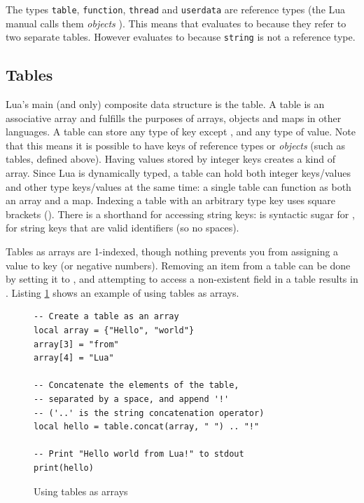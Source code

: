 The types \texttt{table}, \texttt{function}, \texttt{thread} and \texttt{userdata} are reference types (the Lua manual calls them \textit{objects} \cite[\S 2.1]{luareferencemanual}). This means that \lua{{} == {}} evaluates to  because they refer to two separate tables. However  evaluates to  because \texttt{string} is not a reference type.

\subsection{Tables}
Lua's main (and only) composite data structure is the table. A table is an associative array and fulfills the purposes of arrays, objects and maps in other languages. A table can store any type of key except , and any type of value. Note that this means it is possible to have keys of reference types or \textit{objects} (such as tables, defined above). Having values stored by integer keys creates a kind of array. Since Lua is dynamically typed, a table can hold both integer keys/values and other type keys/values at the same time: a single table can function as both an array and a map. Indexing a table with an arbitrary type key uses square brackets (). There is a shorthand for accessing string keys:  is syntactic sugar for , for string keys that are valid identifiers (so no spaces).

Tables as arrays are 1-indexed, though nothing prevents you from assigning a value to key  (or negative numbers). Removing an item from a table can be done by setting it to , and attempting to access a non-existent field in a table results in . Listing \ref{lst:lua_tables} shows an example of using tables as arrays.

\begin{figure}[ht]
\centering
\begin{verbatim}
-- Create a table as an array
local array = {"Hello", "world"}
array[3] = "from"
array[4] = "Lua"

-- Concatenate the elements of the table,
-- separated by a space, and append '!'
-- ('..' is the string concatenation operator)
local hello = table.concat(array, " ") .. "!"

-- Print "Hello world from Lua!" to stdout
print(hello)
\end{verbatim}
\caption{Using tables as arrays}
\label{lst:lua_tables}
\end{figure}

